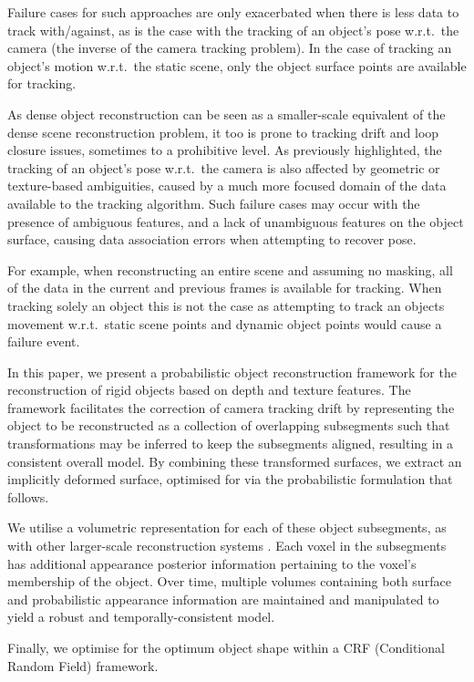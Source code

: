Failure cases for such approaches are only exacerbated when there is less data to track with/against, as is the case with the tracking of an 
object's pose w.r.t.\ the camera (the inverse of the camera tracking problem). In the case of tracking an object's motion w.r.t.\ the static 
scene, only the object surface points are available for tracking.

As dense object reconstruction can be seen as a smaller-scale equivalent of the dense scene reconstruction problem, it too is prone to 
tracking drift and loop closure issues, sometimes to a prohibitive level. As previously highlighted, the tracking of an object's pose w.r.t.\ the camera 
is also affected by geometric or texture-based ambiguities, caused by a much more focused domain of the data available to the tracking algorithm. 
Such failure cases may occur with the presence of ambiguous features, and a lack of unambiguous features on the object surface, causing data 
association errors when attempting to recover pose.

For example, when reconstructing an entire scene and assuming no masking, all of the data in the current and previous frames is available for tracking. When tracking solely an object this is not the case as attempting to track an objects movement w.r.t.\ static scene points and dynamic object points would cause a failure event.

In this paper, we present a probabilistic object reconstruction framework for the reconstruction of rigid objects based on 
depth and texture features. The framework facilitates the correction of camera tracking drift by representing the object to be reconstructed as a
collection of overlapping subsegments such that transformations may be inferred to keep the subsegments aligned, resulting in a consistent
overall model. By combining these transformed surfaces, we extract an implicitly deformed surface, optimised for via the probabilistic formulation 
that follows.

We utilise a volumetric representation for each of these object subsegments, as with other larger-scale reconstruction
systems \cite{Kahler2016}. Each voxel in the subsegments has additional appearance posterior information pertaining to the voxel's membership 
of the object. Over time, multiple volumes containing both surface and probabilistic appearance information are maintained and manipulated to 
yield a robust and temporally-consistent model.

Finally, we optimise for the optimum object shape within a CRF (Conditional Random Field) framework.

